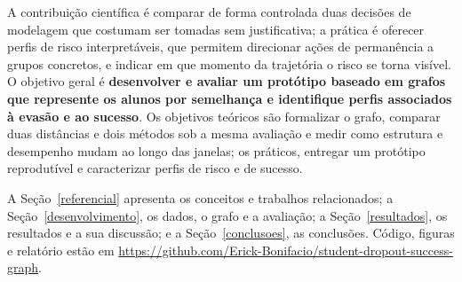 A contribuição científica é comparar de forma controlada duas decisões de modelagem que costumam ser tomadas sem justificativa; a prática é oferecer perfis de risco interpretáveis, que permitem direcionar ações de permanência a grupos concretos, e indicar em que momento da trajetória o risco se torna visível. O objetivo geral é \textbf{desenvolver e avaliar um protótipo baseado em grafos que represente os alunos por semelhança e identifique perfis associados à evasão e ao sucesso}. Os objetivos teóricos são formalizar o grafo, comparar duas distâncias e dois métodos sob a mesma avaliação e medir como estrutura e desempenho mudam ao longo das janelas; os práticos, entregar um protótipo reprodutível e caracterizar perfis de risco e de sucesso.

A Seção~\ref{referencial} apresenta os conceitos e trabalhos relacionados; a Seção~\ref{desenvolvimento}, os dados, o grafo e a avaliação; a Seção~\ref{resultados}, os resultados e a sua discussão; e a Seção~\ref{conclusoes}, as conclusões. Código, figuras e relatório estão em \url{https://github.com/Erick-Bonifacio/student-dropout-success-graph}.
